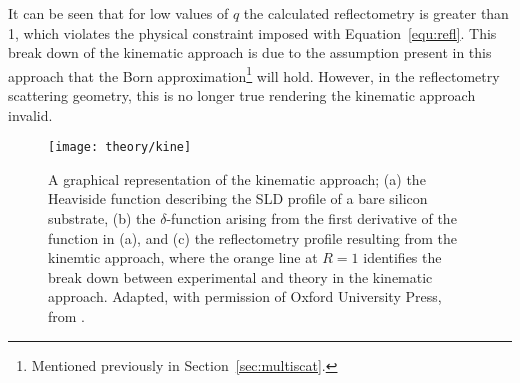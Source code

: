 It can be seen that for low values of $q$ the calculated reflectometry is greater than 1, which violates the physical constraint imposed with Equation~\ref{equ:refl}.
This break down of the kinematic approach is due to the assumption present in this approach that the Born approximation\footnote{Mentioned previously in Section~\ref{sec:multiscat}.} will hold.
However, in the reflectometry scattering geometry, this is no longer true rendering the kinematic approach invalid.
%
\begin{figure}[t]
    \centering
    \texttt{[image: theory/kine]}
    \caption{A graphical representation of the kinematic approach; (a) the Heaviside function describing the SLD profile of a bare silicon substrate, (b) the $\delta$-function arising from the first derivative of the function in (a), and (c) the reflectometry profile resulting from the kinemtic approach, where the orange line at $R=1$ identifies the break down between experimental and theory in the kinematic approach. Adapted, with permission of Oxford University Press, from \cite{sivia_elementary_2011}.}
    \label{fig:kine}
\end{figure}
%

